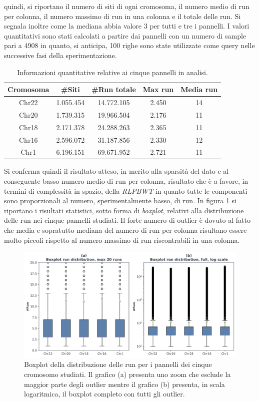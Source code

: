   quindi, si riportano il numero di siti di ogni cromosoma, il 
numero medio di run per colonna, il numero 
massimo di run in una colonna e il totale delle run. Si segnala inoltre come la
mediana abbia valore 3 per tutti e tre i pannelli. I valori quantitativi sono
stati calcolati a partire dai pannelli con un numero di sample pari a 4908 in
quanto, si anticipa, 100 righe sono state utilizzate come query nelle successive
fasi della sperimentazione.
\begin{table}
  \centering
  \caption{Informazioni quantitative relative ai cinque pannelli in analisi.}
  \label{tab:panel}
  \begin{tabular}{c||c|c|c|c}
    Cromosoma & #Siti & #Run totale & Max run & Media run \\ 
    \hline
    Chr22 & 1.055.454 & 14.772.105 & 2.450 & 14\\
    Chr20 & 1.739.315 & 19.966.504 & 2.176 & 11\\
    Chr18 & 2.171.378 & 24.288.263 & 2.365 & 11\\
    Chr16 & 2.596.072 & 31.187.856 & 2.330 & 12\\
    Chr1 & 6.196.151 & 69.671.952 & 2.721 & 11\\
  \end{tabular}
\end{table}
Si conferma quindi il risultato atteso, in merito alla sparsità del dato e al
conseguente basso numero medio di run per colonna, risultato che è a favore, in
termini di 
complessità in spazio, della \textit{RLPBWT} in quanto tutte le componenti sono
proporzionali al numero, sperimentalmente basso, di run. In figura
\ref{fig:boxplot} si riportano i risultati statistici, sotto forma di
\textit{boxplot}, relativi alla distribuzione delle run nei cinque pannelli
studiati. Il forte numero di outlier è dovuto al fatto che media e sopratutto
mediana del numero di run per colonna risultano essere molto piccoli rispetto al
numero massimo di run riscontrabili in una colonna.
\begin{figure}
  \centering
  \includegraphics[width = \linewidth]{img/boxplotbi.png}
  \caption{Boxplot della distribuzione delle run per i pannelli dei cinque
    cromosomo studiati. Il grafico (a) presenta uno zoom che esclude la maggior
    parte degli outlier mentre il grafico (b) presenta, in scala logaritmica, il
    boxplot completo con tutti gli outlier.}
  \label{fig:boxplot}
\end{figure}
